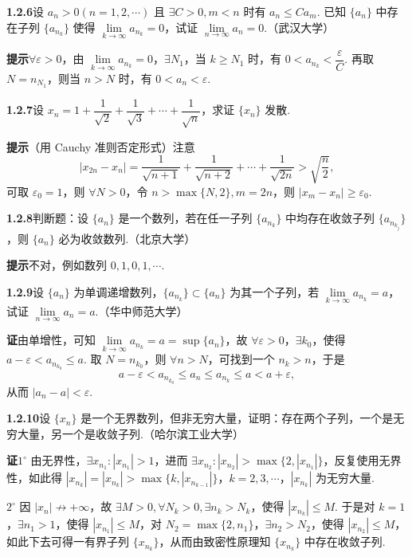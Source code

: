 \documentclass[UTF8, 12pt, fontset=fandol, oneside]{ctexart}
\begin{document}
\noindent\textbf{1.2.6}\quad 设 $a_n>0(n=1,2,\cdots)$ 且 $\exists C>0,m<n$ 时有 $a_n\le Ca_m$. 已知 $\{a_n\}$ 中存在子列 $\{a_{n_k}\}$ 使得 $\lim\limits_{k\to\infty}a_{n_k}=0$，试证 $\lim\limits_{n\to\infty}a_n=0$.（武汉大学）

\noindent\textbf{提示}\quad $\forall\varepsilon>0$，由 $\lim\limits_{k\to\infty}a_{n_k}=0$，$\exists N_1$，当 $k\ge N_1$ 时，有 $0<a_{n_k}<\dfrac{\varepsilon}{C}$. 再取 $N=n_{N_1}$，则当 $n>N$ 时，有 $0<a_n<\varepsilon$.

\noindent\textbf{1.2.7}\quad 设 $x_n=1+\dfrac1{\sqrt2}+\dfrac1{\sqrt3}+\cdots+\dfrac1{\sqrt n}$，求证 $\{x_n\}$ 发散.

\noindent\textbf{提示}\quad （用 Cauchy 准则否定形式）注意
\[
  |x_{2n}-x_n|=\frac1{\sqrt{n+1}}+\frac1{\sqrt{n+2}}+\cdots+\frac1{\sqrt{2n}}
  >\sqrt{\frac n2},
\]
可取 $\varepsilon_0=1$，则 $\forall N>0$，令 $n>\max\{N,2\},m=2n$，则 $|x_m-x_n|\ge\varepsilon_0$.

\noindent\textbf{1.2.8}\quad 判断题：设 $\{a_n\}$ 是一个数列，若在任一子列 $\{a_{n_k}\}$ 中均存在收敛子列 $\{a_{n_{k_j}}\}$，则 $\{a_n\}$ 必为收敛数列.（北京大学）

\noindent\textbf{提示}\quad 不对，例如数列 $0,1,0,1,\cdots$.

\noindent\textbf{1.2.9}\quad 设 $\{a_n\}$ 为单调递增数列，$\{a_{n_k}\}\subset\{a_n\}$ 为其一个子列，若 $\lim\limits_{k\to\infty}a_{n_k}=a$，试证 $\lim\limits_{n\to\infty}a_n=a$.（华中师范大学）

\noindent\textbf{证}\quad 由单增性，可知 $\lim\limits_{k\to\infty}a_{n_k}=a=\sup\{a_n\}$，故 $\forall\varepsilon>0$，$\exists k_0$，使得 $a-\varepsilon<a_{n_{k_0}}\le a$. 取 $N=n_{k_0}$，则 $\forall n>N$，可找到一个 $n_k>n$，于是
\[
  a-\varepsilon<a_{n_{k_0}}\le a_n\le a_{n_k}\le a<a+\varepsilon,
\]
从而 $|a_n-a|<\varepsilon$.

\noindent\textbf{1.2.10}\quad 设 $\{x_n\}$ 是一个无界数列，但非无穷大量，证明：存在两个子列，一个是无穷大量，另一个是收敛子列.（哈尔滨工业大学）

\noindent\textbf{证}\quad $1^\circ$ 由无界性，$\exists x_{n_1}:|x_{n_1}|>1$，进而 $\exists x_{n_2}:|x_{n_2}|>\max\{2,|x_{n_1}|\}$，反复使用无界性，如此得 $|x_{n_k}|=|x_{n_k}|>\max\{k,|x_{n_{k-1}}|\}$，$k=2,3,\cdots$，$|x_{n_k}|$ 为无穷大量.

$2^\circ$ 因 $|x_n|\not\to+\infty$，故 $\exists M>0,\forall N_k>0,\exists n_k>N_k$，使得 $|x_{n_k}|\le M$. 于是对 $k=1$，$\exists n_1>1$，使得 $|x_{n_1}|\le M$，对 $N_2=\max\{2,n_1\}$，$\exists n_2>N_2$，使得 $|x_{n_2}|\le M$，如此下去可得一有界子列 $\{x_{n_k}\}$，从而由致密性原理知 $\{x_{n_k}\}$ 中存在收敛子列.
\end{document}
